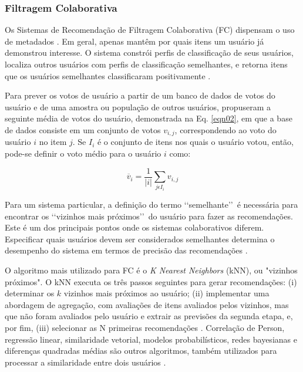 \subsubsection{Filtragem Colaborativa}

Os Sistemas de Recomendação de Filtragem Colaborativa (FC) dispensam o uso de metadados \cite{mauricio}. 
Em geral, apenas mantêm por quais itens um usuário já demonstrou interesse. O sistema constrói perfis de classificação 
de seus usuários, localiza outros usuários com perfis de classificação 
semelhantes, e retorna itens que os usuários semelhantes classificaram 
positivamente \cite{son2017}.

Para prever os votos de usuário a partir de um banco de dados de votos do usuário e de uma amostra ou população de outros usuários, 
 propuseram a seguinte média de votos do usuário, demonstrada na  Eq. \ref{eqn02}, em que a base de dados 
consiste em um conjunto de votos $v_{i,j}$, correspondendo ao voto do usuário $i$ no item $j$. Se $I_{i}$ é o
conjunto de itens nos quais o usuário votou, então, pode-se definir o voto médio para o usuário $i$ como:

\begin{equation}
	\label{eqn02}
\overline{v}_{i} = \frac{1}{\left | i \right |} \sum_{j\epsilon I_{i}}^{} v_{i,j}
\end{equation}


Para um sistema particular, a definição do termo \lq\lq semelhante\rq\rq\ é necessária para encontrar 
os \lq\lq vizinhos mais próximos\rq\rq\ do usuário para fazer as recomendações. Este é um dos principais 
pontos onde os sistemas colaborativos diferem. Especificar quais usuários devem ser considerados semelhantes determina o
desempenho do sistema em termos de precisão das recomendações \cite{son2017}.

O algoritmo mais utilizado para FC é o \emph{K Nearest Neighbors} (kNN), ou "vizinhos próximos". O kNN executa 
os três passos seguintes para gerar recomendações: (i) determinar os $k$ vizinhos mais próximos ao usuário; (ii) implementar 
uma abordagem de agregação, com avaliações de itens avaliados pelos vizinhos, mas que não foram avaliados pelo usuário e 
extrair as previsões da segunda etapa, e, por fim, (iii) selecionar as N primeiras recomendações \cite{bobadilla2013}. Correlação de Person, regressão linear, 
similaridade vetorial, modelos probabilísticos, redes bayesianas e diferenças quadradas médias são outros algoritmos, também utilizados para processar a similaridade entre dois usuários \cite{paulson2003}.

